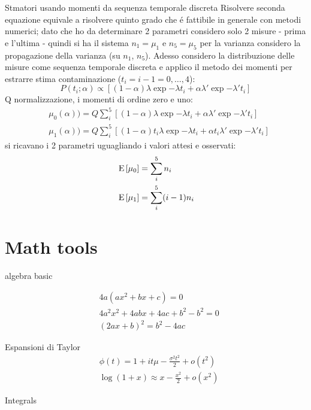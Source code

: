 \documentclass[asd-beamer.tex]{subfiles}
\begin{document}
\begin{frame}{Stmatori usando momenti da sequenza temporale discreta}
Risolvere seconda equazione equivale a risolvere quinto grado che \'e fattibile in generale con metodi numerici; dato che ho da determinare 2 parametri considero solo 2 misure - prima e l'ultima - quindi si ha il sistema $n_1=\mu_1$ e $n_5=\mu_5$ per la varianza considero la propagazione della varianza (su $n_1$, $n_5$).
Adesso considero la distribuzione delle misure come sequenza temporale discreta e applico il metodo dei momenti per estrarre stima contaminazione ($t_i=i-1=0,\ldots,4$):
\[P(t_i;\alpha)\propto[(1-\alpha)\lambda\exp{-\lambda t_i}+\alpha\lambda'\exp{-\lambda't_i}]\]
Q normalizzazione, i momenti di ordine zero e uno:
\begin{align*}
&\mu_0(\alpha))=Q\sum_i^5[(1-\alpha)\lambda\exp{-\lambda t_i}+\alpha\lambda'\exp{-\lambda't_i}]\\
&\mu_1(\alpha))=Q\sum_i^5[(1-\alpha)t_i\lambda\exp{-\lambda t_i}+\alpha t_i\lambda'\exp{-\lambda't_i}]
\end{align*}
si ricavano i 2 parametri uguagliando i valori attesi e osservati:
\begin{align*}
&\operatorname{E}{[\mu_0]}=\sum_i^5n_i\\
&\operatorname{E}{[\mu_1]}=\sum_i^5(i-1)n_i
\end{align*}
\end{frame}

\section{Math tools}

\begin{frame}{algebra basic}

\begin{align*}
&4a(ax^2+bx+c)=0\\
&4a^2x^2+4abx+4ac+b^2-b^2=0\\
&(2ax+b)^2=b^2-4ac
\end{align*}
%
\end{frame}

\begin{wordonframe}{Espansioni di Taylor}
	\begin{align*}
	&\phi(t)=1+it\mu-\frac{\sigma^2t^2}{2}+o(t^2)\\
	&\log{(1+x)}\approx x-\frac{x^2}{2}+o(x^2)
	\end{align*}
\end{wordonframe}

\begin{frame}{Integrals}
\begin{columns}[T]\begin{column}{0.5\textwidth}

\end{column}\begin{column}{0.5\textwidth}
\end{column}\end{columns}
\end{frame}
\end{document}
